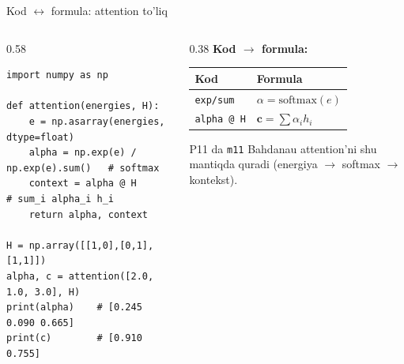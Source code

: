 \documentclass[aspectratio=169,11pt]{beamer}
\begin{document}
\begin{frame}[fragile]{Kod $\leftrightarrow$ formula: attention to'liq}
  \begin{columns}[T]
    \begin{column}{0.58\textwidth}
\begin{lstlisting}
import numpy as np

def attention(energies, H):
    e = np.asarray(energies, dtype=float)
    alpha = np.exp(e) / np.exp(e).sum()   # softmax
    context = alpha @ H                    # sum_i alpha_i h_i
    return alpha, context

H = np.array([[1,0],[0,1],[1,1]])
alpha, c = attention([2.0, 1.0, 3.0], H)
print(alpha)    # [0.245 0.090 0.665]
print(c)        # [0.910 0.755]
\end{lstlisting}
    \end{column}
    \begin{column}{0.38\textwidth}
      \textbf{Kod $\to$ formula:}\\[3pt]
      \footnotesize
      \begin{tabular}{p{1.7cm}p{1.9cm}}
        \toprule
        Kod & Formula \\
        \midrule
        \texttt{exp/sum} & $\alpha=\mathrm{softmax}(e)$ \\
        \texttt{alpha @ H} & $\mathbf{c}=\sum\alpha_i h_i$ \\
        \bottomrule
      \end{tabular}
      \vspace{4pt}
      \begin{tcolorbox}[okbox,top=2pt,bottom=2pt]
        \footnotesize
        P11 da \texttt{m11} Bahdanau attention'ni shu mantiqda quradi
        (energiya $\to$ softmax $\to$ kontekst).
      \end{tcolorbox}
    \end{column}
  \end{columns}
\end{frame}
\end{document}
